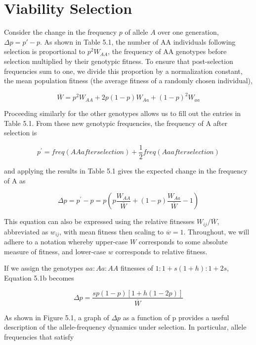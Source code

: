\documentclass{article}
\begin{document}
\section{Viability Selection}
Consider the change in the frequency $p$ of allele $A$ over one generation, $\Delta p = p' - p$. As shown in Table 5.1, the number of AA individuals following selection is proportional to $p^2 W_{AA}$, the frequency of AA genotypes before selection multiplied by their genotypic fitness. To ensure that post-selection frequencies sum to one, we divide this proportion by a normalization constant, the mean population fitness (the average fitness of a randomly chosen individual),

\begin{equation}
\overline{W}=p^{2}W_{A A}+2p\left(1-p\right)W_{A a}+\left(1-p\right)^{2}W_{a a}
\tag{5.1a}
\label{eq:5_1a}
\end{equation}

Proceeding similarly for the other genotypes allows us to fill out the entries in Table 5.1. From these new genotypic frequencies, the frequency of A after selection is

\begin{equation}
p^{\prime}=freq(AA after selection)+\frac{1}{2}freq(Aa after selection)
\end{equation}

and applying the results in Table 5.1 gives the expected change in the frequency of A as

\begin{equation}
\Delta p=p^{\prime}-p=p\left(p\frac{W_{A A}}{\overline{W}}+(1-p)\frac{W_{A a}}{\overline{W}}-1\right)
\tag{5.1b}
\label{eq:5_1b}
\end{equation}

This equation can also be expressed using the relative fitnesses  $ W_{ij}/\overline{W} $, abbreviated as  $ w_{ij} $, with mean fitness then scaling to  $ \overline{w} = 1 $. Throughout, we will adhere to a notation whereby upper-case  $ W $ corresponds to some absolute measure of fitness, and lower-case  $ w $ corresponds to relative fitness.

If we assign the genotypes  $ aa:Aa:AA $ fitnesses of  $ 1:1+s(1+h):1+2s $, Equation 5.1b becomes

\begin{equation}
\Delta p=\frac{sp(1-p)[1+h(1-2p)]}{\overline{W}}
\tag{5.1c}
\label{eq:5_1c}
\end{equation}

As shown in Figure 5.1, a graph of  $ \Delta p $ as a function of p provides a useful description of the allele-frequency dynamics under selection. In particular, allele frequencies that satisfy
\end{document}
